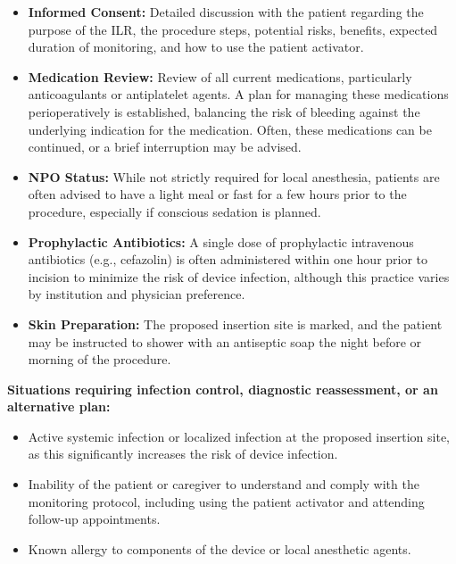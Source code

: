\begin{itemize}
  \item \textbf{Informed Consent:} Detailed discussion with the patient regarding the purpose of the ILR, the procedure steps, potential risks, benefits, expected duration of monitoring, and how to use the patient activator.
  \item \textbf{Medication Review:} Review of all current medications, particularly anticoagulants or antiplatelet agents. A plan for managing these medications perioperatively is established, balancing the risk of bleeding against the underlying indication for the medication. Often, these medications can be continued, or a brief interruption may be advised.
  \item \textbf{NPO Status:} While not strictly required for local anesthesia, patients are often advised to have a light meal or fast for a few hours prior to the procedure, especially if conscious sedation is planned.
  \item \textbf{Prophylactic Antibiotics:} A single dose of prophylactic intravenous antibiotics (e.g., cefazolin) is often administered within one hour prior to incision to minimize the risk of device infection, although this practice varies by institution and physician preference.
  \item \textbf{Skin Preparation:} The proposed insertion site is marked, and the patient may be instructed to shower with an antiseptic soap the night before or morning of the procedure.
\end{itemize}

\textbf{Situations requiring infection control, diagnostic reassessment, or an alternative plan:}
\begin{itemize}
  \item Active systemic infection or localized infection at the proposed insertion site, as this significantly increases the risk of device infection.
  \item Inability of the patient or caregiver to understand and comply with the monitoring protocol, including using the patient activator and attending follow-up appointments.
  \item Known allergy to components of the device or local anesthetic agents.
\end{itemize}

